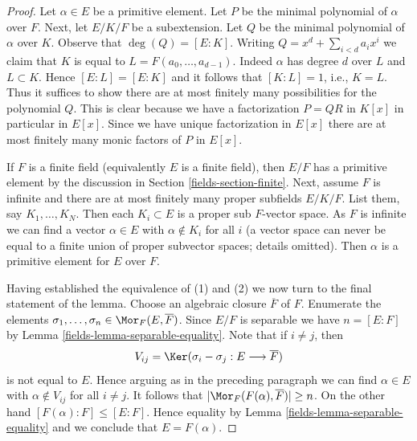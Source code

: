 \begin{proof}

Let $\alpha \in E$ be a primitive element. Let $P$ be the minimal
polynomial of $\alpha$ over $F$. Next, let $E/K/F$ be a subextension.
Let $Q$ be the minimal polynomial of $\alpha$ over $K$. Observe that
$\deg(Q) = [E : K]$. Writing $Q = x^d + \sum_{i < d} a_i x^i$ we claim that
$K$ is equal to $L = F(a_0, \ldots, a_{d - 1})$. Indeed $\alpha$ has degree
$d$ over $L$ and $L \subset K$. Hence $[E : L] = [E : K]$ and it follows
that $[K : L] = 1$, i.e., $K = L$.
Thus it suffices to show there are at most finitely many possibilities
for the polynomial $Q$. This is clear because we have a factorization
$P = QR$  in $K[x]$ in particular in $E[x]$. Since we have unique
factorization in $E[x]$ there are at most finitely many monic
factors of $P$ in $E[x]$.

\medskip\noindent
If $F$ is a finite field (equivalently $E$ is a finite field), then
$E/F$ has a primitive element by the discussion in
Section \ref{fields-section-finite}.
Next, assume $F$ is infinite and there are at most finitely many proper
subfields $E/K/F$. List them, say $K_1, \ldots, K_N$. Then
each $K_i \subset E$ is a proper sub $F$-vector space. As $F$ is infinite
we can find a vector $\alpha \in E$ with $\alpha \not \in K_i$ for all $i$
(a vector space can never be equal to a finite union of proper subvector spaces;
details omitted). Then $\alpha$ is a primitive element for $E$ over $F$.

\medskip\noindent
Having established the equivalence of (1) and (2) we now turn to
the final statement of the lemma. Choose an algebraic closure
$\overline{F}$ of $F$. Enumerate the elements
$\sigma_1, \ldots, \sigma_n \in \Mor_F(E, \overline{F})$.
Since $E/F$ is separable we have $n = [E : F]$ by
Lemma \ref{fields-lemma-separable-equality}.
Note that if $i \not = j$, then
$$
V_{ij} = \Ker(\sigma_i - \sigma_j : E \longrightarrow \overline{F})
$$
is not equal to $E$. Hence arguing as in the preceding paragraph
we can find $\alpha \in E$ with $\alpha \not \in V_{ij}$ for all
$i \not = j$. It follows that $|\Mor_F(F(\alpha), \overline{F})| \geq n$.
On the other hand $[F(\alpha) : F] \leq [E : F]$. Hence equality
by Lemma \ref{fields-lemma-separable-equality}
and we conclude that $E = F(\alpha)$.
\end{proof}


